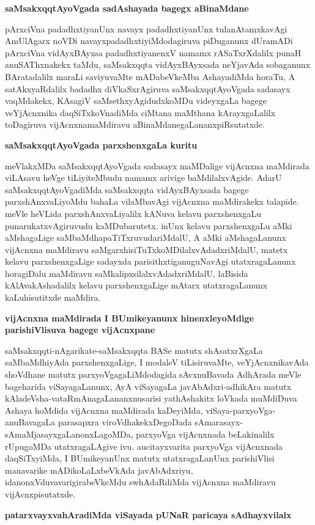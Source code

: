 \textbf{saMsakxqqtAyoVgada sadAshayada bagegx aBinaMdane}

pArxciVna padadhxtiyanUnx navayx padadhxtiyanUnx tulanAtamxkavAgi AmUlAgarx noVDi navayxpadadhxtiyiMdodagiruva piDuganunx dUramADi pArxciVna vidAyxBAyxsa padadhxtiyanenxV namamx rASaTxrXdalilx punaH anuSAThxnakekx taMdu, saMsakxqqta vidAyxBAyxsada neYjavAda sobaganunx BAratadalilx maraLi saviyuvaMte mADabeVkeMba
AshayadiMda horaTu, A satAkxyaRdalilx badadhx diVkaSxrAgiruva saMsakxqqtAyoVgada sadasayx vaqMdakekx, KAsagiV saMsethxyAgidudxkoMDu videyxgaLa bagege veYjAcnxnika daqSiTxkoVnadiMda ciMtana maMthana kArayxgaLalilx toDagiruva vijAcnxnamaMdiravu aBinaMdanegaLananxpiRsutatxde.

\textbf{saMsakxqqtAyoVgada parxshenxgaLa kuritu}

meVlakxMDa saMsakxqqtAyoVgada sadasayx maMDalige vijAcnxna maMdirada viLAsavu heVge tiLiyiteMbudu namamx arivige baMdilalxvAgide. AdarU saMsakxqqtAyoVgadiMda saMsakxqqta vidAyxBAyxsada bagege parxshAnxvaLiyoMdu bahaLa vilaMbavAgi vijAcnxna maMdirakekx talapide. meVle heVLida parxshAnxvaLiyalilx kANuva kelavu parxshenxgaLu punarukatxvAgiruvudu kaMDubarutetx. inUnx kelavu parxshenxgaLu aMki aMshagaLige saMbaMdhapaTiTxruvudariMdalU, A aMki aMshagaLanunx vijAcnxna maMdiravu saMgarxhisiTuTxkoMDilalxvAdadxriMdalU, matetx kelavu parxshenxgaLige sadayxda parisithxtiganuguNavAgi utatxragaLanunx horagiDalu maMdiravu saMkalipxsilalxvAdadxriMdalU, laBisida kAlAvakAshadalilx kelavu parxshenxgaLige mAtarx utatxragaLanunx kaLuhisutitxde maMdira.

\textbf{vijAcnxna maMdirada I BUmikeyanunx hinenxleyoMdige parishiVlisuva bagege vijAcnxpane}

saMsakxqqti-nAgarikate-saMsakxqqta BASe matutx shAsatxrXgaLa saMbaMdhiyAda parxshenxgaLige, I modaleV tiLisiruvaMte, veYjAcnxnikavAda shoVdhane matutx parxyoVgagaLiMdodagida sAvxnuBavada AdhArada meVle bageharida viSayagaLanunx, AyA viSayagaLa javAbAdxri-adhikAra matutx kAladeVsha-vataRmAnagaLananxnusarisi yathAshakitx loVkada muMdiDuva Ashaya hoMdida vijAcnxna maMdirada kaDeyiMda, viSaya-parxyoVga-anuBavagaLa parasapxra viroVdhakekxDegoDada sAmarasayx-sAmaMjasayxgaLanonxLagoMDa, parxyoVga vijAcnxnada beLakinalilx rUpugoMDa utatxragaLAgive ivu. aucitayxvarita parxyoVga vijAcnxnada daqSiTxyiMda, I BUmikeyanUnx matutx utatxragaLanUnx parishiVlisi manavarike mADikoLaLxbeVkAda javAbAdxriyu, idanonxVduvavarigirabeVkeMdu swhAdaRdiMda vijAcnxna maMdiravu vijAcnxpisutatxde.

\textbf{patarxvayxvahAradiMda viSayada pUNaR paricaya sAdhayxvilalx}

